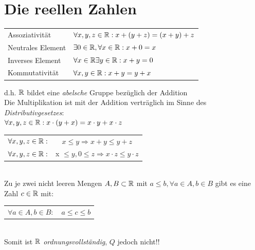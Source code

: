 \documentclass[a4paper]{article}
\begin{document}
\section{Die reellen Zahlen}
	\begin{fmerke}
	\begin{multicols}{2}
		\begin{tabular}{l l}
			Assoziativität & $\forall x,y,z \in \mathbb{R}: x +(y+z) =
			(x+y)+z$\\
			Neutrales Element & $\exists 0 \in \mathbb{R}, \forall x \in \mathbb{R}: x+0=x$\\
			Inverses Element & $\forall x \in \mathbb{R} \exists y\in \mathbb{R}: x+y=0$\\
			Kommutativität & $\forall x,y \in \mathbb{R}: x+y=y+x$
		\end{tabular}
		d.h. $\mathbb{R}$ bildet eine \textit{abelsche} Gruppe bezüglich der
		Addition\\
		Die Multiplikation ist mit der Addition verträglich im Sinne
		des \textit{Distributivgesetzes}:\\
		$\forall x,y,z \in \mathbb{R}: x \cdot(y+x)= x\cdot y + x\cdot z$
	\end{multicols}
	\vspace{-4.5mm}
	\end{fmerke}

	\begin{fmerke}[ordnungsvollständig]
	\begin{tabular}{c c}
		$\forall x,y,z \in \mathbb{R}:$ & $x \leq y \Rightarrow x+y \leq y+z$\\
		$\forall x,y,z \in \mathbb{R}:$ & x $\leq y, 0 \leq z \Rightarrow x \cdot z \leq y\cdot
		z$
	\end{tabular}
	\\
		Zu je zwei nicht leeren Mengen $A,B \subset \mathbb{R}$ mit $a \leq b, \forall a \in A, b\in
		B$ gibt es eine Zahl $c \in \mathbb{R}$ mit:
	\\
	\begin{tabular}{c c}
		$\forall a \in A, b\in B:$ & $a\leq c \leq b$
	\end{tabular}
	\\
		Somit ist $\mathbb{R}$ \textit{ordnungsvollständig}, $Q$ jedoch
		nicht!!
	\end{fmerke}
\end{document}
